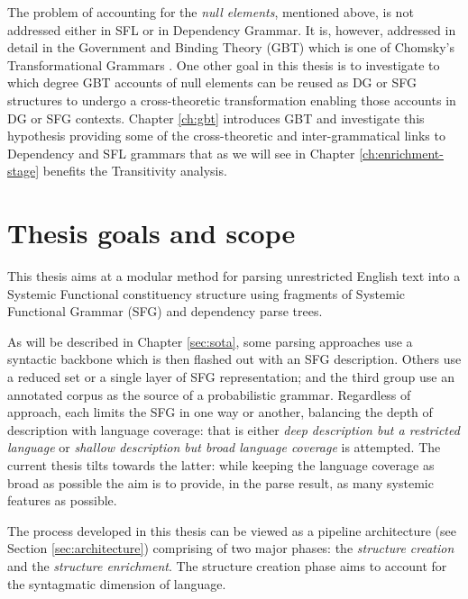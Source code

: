 The problem of accounting for the \textit{null elements}, mentioned above, is not addressed either in SFL or in Dependency Grammar. It is, however, addressed in detail in the Government and Binding Theory (GBT) \citep{Chomsky81,Haegeman1991} which is one of Chomsky's Transformational Grammars \citep{Chomsky1957}. One other goal in this thesis is to investigate to which degree GBT accounts of null elements can be reused as DG or SFG structures to undergo a cross-theoretic transformation enabling those accounts in DG or SFG contexts. Chapter \ref{ch:gbt} introduces GBT and investigate this hypothesis providing some of the cross-theoretic and inter-grammatical links to Dependency and SFL grammars that as we will see in Chapter \ref{ch:enrichment-stage} benefits the Transitivity analysis.


\section{Thesis goals and scope}
\label{sec:solution}

This thesis aims at a modular method for parsing unrestricted English text into a Systemic Functional constituency structure using fragments of Systemic Functional Grammar (SFG) and dependency parse trees.

As will be described in Chapter \ref{sec:sota}, some parsing approaches use a syntactic backbone which is then flashed out with an SFG description. Others use a reduced set or a single layer of SFG representation; and the third group use an annotated corpus as the source of a probabilistic grammar. Regardless of approach, each limits the SFG in one way or another, balancing the depth of description with language coverage: that is either \textit{deep description but a restricted language} or \textit{shallow description but broad language coverage} is attempted. The current thesis tilts towards the latter: while keeping the language coverage as broad as possible the aim is to provide, in the parse result, as many systemic features as possible.

The process developed in this thesis can be viewed as a pipeline architecture (see Section \ref{sec:architecture}) comprising of two major phases: the \textit{structure creation} and the \textit{structure enrichment}. The structure creation phase aims to account for the syntagmatic dimension of language. 

